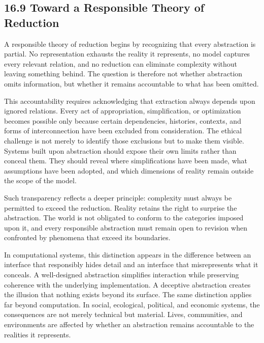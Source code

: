 \documentclass[12pt,letterpaper]{article}
\theoremstyle{remark}
\begin{document}
\subsection{16.9 Toward a Responsible Theory of Reduction}

A responsible theory of reduction begins by recognizing that every abstraction is partial. No representation exhausts the reality it represents, no model captures every relevant relation, and no reduction can eliminate complexity without leaving something behind. The question is therefore not whether abstraction omits information, but whether it remains accountable to what has been omitted.

This accountability requires acknowledging that extraction always depends upon ignored relations. Every act of appropriation, simplification, or optimization becomes possible only because certain dependencies, histories, contexts, and forms of interconnection have been excluded from consideration. The ethical challenge is not merely to identify those exclusions but to make them visible. Systems built upon abstraction should expose their own limits rather than conceal them. They should reveal where simplifications have been made, what assumptions have been adopted, and which dimensions of reality remain outside the scope of the model.

Such transparency reflects a deeper principle: complexity must always be permitted to exceed the reduction. Reality retains the right to surprise the abstraction. The world is not obligated to conform to the categories imposed upon it, and every responsible abstraction must remain open to revision when confronted by phenomena that exceed its boundaries.

In computational systems, this distinction appears in the difference between an interface that responsibly hides detail and an interface that misrepresents what it conceals. A well-designed abstraction simplifies interaction while preserving coherence with the underlying implementation. A deceptive abstraction creates the illusion that nothing exists beyond its surface. The same distinction applies far beyond computation. In social, ecological, political, and economic systems, the consequences are not merely technical but material. Lives, communities, and environments are affected by whether an abstraction remains accountable to the realities it represents.
\end{document}

